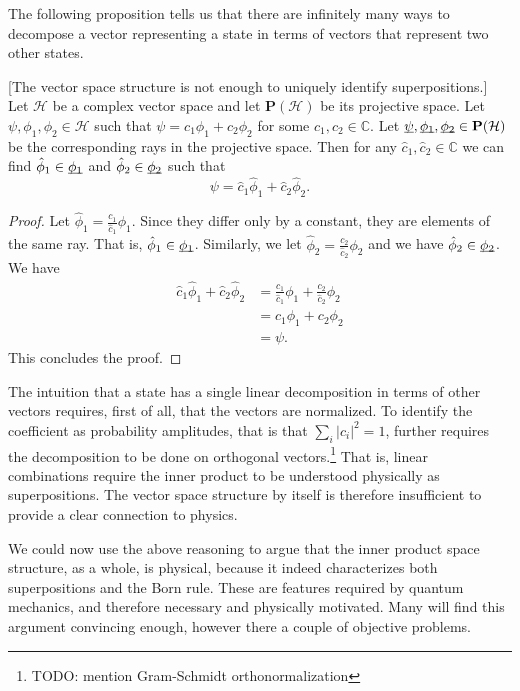 \documentclass[10pt,twocolumn, nofootinbib]{revtex4-2}
\begin{document}
The following proposition tells us that there are infinitely many ways to decompose a vector representing a state in terms of vectors that represent two other states.
\begin{prop}\label{vector_insufficient}[The vector space structure is not enough to uniquely identify superpositions.] Let $\mathcal{H}$ be a complex vector space and let $\textbf{P}(\mathcal{H})$ be its projective space. Let $\psi, \phi_1, \phi_2 \in \mathcal{H}$ such that $\psi = c_1 \phi_1 + c_2 \phi_2$ for some $c_1, c_2 \in \mathbb{C}$. Let $\underbar{$\psi$}, \underbar{$\phi_1$}, \underbar{$\phi_2$} \in \textbf{P}(\mathcal{H})$ be the corresponding rays in the projective space. Then for any $\hat{c}_1, \hat{c}_2 \in \mathbb{C}$ we can find $\hat{\phi}_1 \in \underbar{$\phi_1$}$ and $\hat{\phi}_2 \in \underbar{$\phi_2$}$ such that
$$\psi = \hat{c}_1 \hat{\phi}_1 + \hat{c}_2 \hat{\phi}_2.$$
\end{prop}

\begin{proof}
Let $\hat{\phi}_1 = \frac{c_1}{\hat{c}_1} \phi_1$. Since they differ only by a constant, they are elements of the same ray. That is, $\hat{\phi}_1 \in \underbar{$\phi_1$}$. Similarly, we let $\hat{\phi}_2 = \frac{c_2}{\hat{c}_2} \phi_2$ and we have $\hat{\phi}_2 \in \underbar{$\phi_2$}$. We have
\begin{equation}
\begin{aligned}
	\hat{c}_1 \hat{\phi}_1 + \hat{c}_2 \hat{\phi}_2 &= \frac{c_1}{\hat{c}_1} \phi_1 + \frac{c_2}{\hat{c}_2} \phi_2 \\
	&= c_1 \phi_1 + c_2 \phi_2 \\ 
	&= \psi.
	\end{aligned}
\end{equation}
This concludes the proof.
\end{proof}

The intuition that a state has a single linear decomposition in terms of other vectors requires, first of all, that the vectors are normalized. To identify the coefficient as probability amplitudes, that is that $\sum_i |c_i|^2 = 1$, further requires the decomposition to be done on orthogonal vectors.\footnote{TODO: mention Gram-Schmidt orthonormalization} That is, linear combinations require the inner product to be understood physically as superpositions. The vector space structure by itself is therefore insufficient to provide a clear connection to physics.

We could now use the above reasoning to argue that the inner product space structure, as a whole, is physical, because it indeed characterizes both superpositions and the Born rule. These are features required by quantum mechanics, and therefore necessary and physically motivated. Many will find this argument convincing enough, however there a couple of objective problems.
\end{document}
